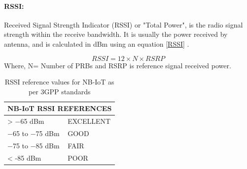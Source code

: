 \documentclass[12pt]{article}
\begin{document}
\paragraph{RSSI:}
Received Signal Strength Indicator (RSSI) or "Total  Power", is the radio  signal  strength  within  the  receive bandwidth. It is usually the power received by antenna, and is  calculated in dBm using an equation \ref{RSSI} \cite{3GPP}.

\begin{equation}
      RSSI = {12 \times N \times RSRP}
      \label{RSSI}
\end{equation}
Where, N= Number of PRBs and RSRP is reference signal received power.

\begin{table}[h]

\centering
\caption {RSSI reference values for NB-IoT as per 3GPP standards \cite{3GPP,sikora2019performance}}

\begin{tabular}{|p{5cm}|p{5cm}|}
\hline
\multicolumn{2}{|c|}{NB-IoT RSSI REFERENCES} \\ \hline
 > −65 dBm                           & EXCELLENT                     \\ \hline
−65 to −75 dBm                      & GOOD                          \\ \hline
−75 to −85 dBm                      & FAIR                          \\ \hline
< -85 dBm                           & POOR                          \\ \hline
\end{tabular}
\label{nbiotRSSI}

\end{table}


\begin{table}[H]
\caption {RSSI reference values for Sigfox \cite{sigfoxRSSI}}
\centering
{}
\label{sigfoxRSSI}
\end{table}
\end{document}
